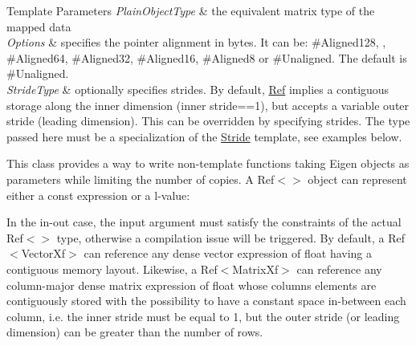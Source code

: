 \begin{DoxyTemplParams}{Template Parameters}
{\em Plain\+Object\+Type} & the equivalent matrix type of the mapped data \\
\hline
{\em Options} & specifies the pointer alignment in bytes. It can be\+: {\ttfamily \#\+Aligned128}, , {\ttfamily \#\+Aligned64}, {\ttfamily \#\+Aligned32}, {\ttfamily \#\+Aligned16}, {\ttfamily \#\+Aligned8} or {\ttfamily \#\+Unaligned}. The default is {\ttfamily \#\+Unaligned}. \\
\hline
{\em Stride\+Type} & optionally specifies strides. By default, \mbox{\hyperlink{class_eigen_1_1_ref}{Ref}} implies a contiguous storage along the inner dimension (inner stride==1), but accepts a variable outer stride (leading dimension). This can be overridden by specifying strides. The type passed here must be a specialization of the \mbox{\hyperlink{class_eigen_1_1_stride}{Stride}} template, see examples below.\\
\hline
\end{DoxyTemplParams}
This class provides a way to write non-\/template functions taking Eigen objects as parameters while limiting the number of copies. A Ref$<$$>$ object can represent either a const expression or a l-\/value\+: 
\begin{DoxyCode}{0}
\DoxyCodeLine{\textcolor{comment}{// in-out argument:}}
\DoxyCodeLine{}
\DoxyCodeLine{\textcolor{comment}{// read-only const argument:}}
\end{DoxyCode}


In the in-\/out case, the input argument must satisfy the constraints of the actual Ref$<$$>$ type, otherwise a compilation issue will be triggered. By default, a Ref$<$\+Vector\+Xf$>$ can reference any dense vector expression of float having a contiguous memory layout. Likewise, a Ref$<$\+Matrix\+Xf$>$ can reference any column-\/major dense matrix expression of float whose column\textquotesingle{}s elements are contiguously stored with the possibility to have a constant space in-\/between each column, i.\+e. the inner stride must be equal to 1, but the outer stride (or leading dimension) can be greater than the number of rows.

